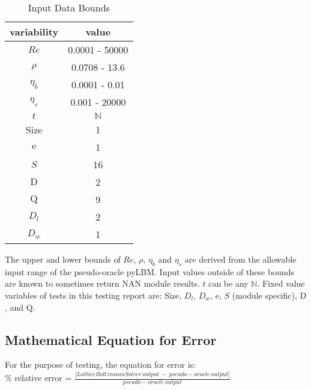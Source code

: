 \documentclass[12pt, titlepage]{article}
\newcommand{\famname}{Lattice Boltzmann Solver}
\begin{document}
\begin{table}[!h]
\begin{center}
\begin{tabular}{| c | c |}
\hline
\textbf{variability} & \textbf{value}\\
\hline
$Re$& 0.0001 - 50000\\
\hline
$\rho$ & 0.0708 - 13.6\\
\hline
$\eta_b$ & 0.0001 - 0.01\\
\hline
$\eta_s$ & 0.001 - 20000\\
\hline
$t$ & $\mathbb{N}$\\
\hline
Size & 1\\
\hline
$\mathrm{e}$ & 1\\
\hline
$S$ & 16\\
\hline
$\mathrm{D}$ & 2\\
\hline
$\mathrm{Q}$ & 9\\
\hline
$D_{l}$ & 2\\
\hline
$D_{w}$ & 1\\
\hline
\end{tabular}
\caption{Input Data Bounds}
\label{table:inputdatabounds}
\end{center}
\end{table}


\noindent The upper and lower bounds of $Re$, $\rho$, $\eta_b$ and $\eta_s$ are
derived from the allowable input range of the pseudo-oracle pyLBM. Input values
outside of these bounds are known to sometimes return NAN module results. $t$
can be any $\mathbb{N}$. Fixed value variables of tests in this testing report
are: Size, $D_{l}$, $D_{w}$,
$\mathrm{e}$, $S$ (module specific), $\mathrm{D}$, and $\mathrm{Q}$.

\subsection{Mathematical Equation for Error}
\label{eqerror}

For the purpose of testing, the equation for error is:\\

\% relative error = $\frac{ |{\famname}\ output\ -\ pseudo-oracle\ output| }{pseudo-oracle\ output}$
\end{document}
